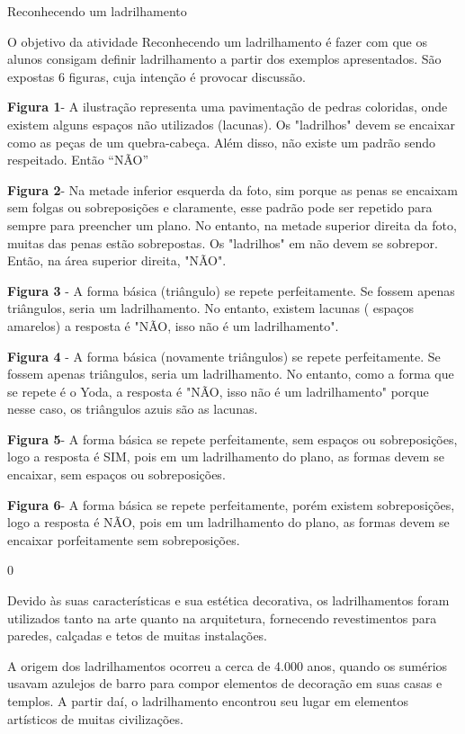 \begin{answer}{Reconhecendo um ladrilhamento}
{
	O objetivo da atividade Reconhecendo um ladrilhamento é fazer com que os alunos consigam definir ladrilhamento a partir dos exemplos apresentados. São expostas 6 figuras, cuja intenção é provocar discussão.

	\textbf{Figura 1}- A ilustração representa uma pavimentação de pedras coloridas, onde existem alguns espaços não utilizados (lacunas).  Os "ladrilhos" devem se encaixar como as peças de um quebra-cabeça. Além disso, não existe um padrão sendo respeitado. Então “NÃO”

	\textbf{Figura 2}- Na metade inferior esquerda da foto, sim porque as penas se encaixam sem folgas ou sobreposições e claramente, esse padrão pode ser repetido para sempre para preencher um plano. No entanto, na metade superior direita da foto, muitas das penas estão sobrepostas. Os "ladrilhos" em não devem se sobrepor. Então, na área superior direita, "NÃO".

	\textbf{Figura 3} - A forma básica (triângulo) se repete perfeitamente. Se fossem apenas triângulos, seria um ladrilhamento. No entanto, existem lacunas ( espaços amarelos) a resposta é  "NÃO, isso não é um ladrilhamento".

	\textbf{Figura 4} - A forma básica (novamente triângulos) se repete perfeitamente. Se fossem apenas triângulos, seria um ladrilhamento. No entanto, como a forma que se repete é o Yoda, a resposta é  "NÃO, isso não é um ladrilhamento" porque nesse caso, os triângulos azuis são as lacunas.


	\textbf{Figura 5}- A forma básica se repete perfeitamente, sem espaços ou sobreposições, logo a resposta é SIM, pois em um ladrilhamento do plano, as formas devem se encaixar, sem espaços ou sobreposições.

	\textbf{Figura 6}-  A forma básica se repete perfeitamente, porém existem sobreposições, logo a resposta é NÃO, pois em um ladrilhamento do plano, as formas devem se encaixar porfeitamente sem sobreposições.
}{0}
\end{answer}


\label{ladri-exp-1}

Devido às suas características e sua estética decorativa, os ladrilhamentos foram utilizados tanto na arte quanto na arquitetura, fornecendo revestimentos para paredes, calçadas e tetos de muitas instalações. 

A origem dos ladrilhamentos ocorreu a cerca de  4.000 anos, quando os sumérios usavam azulejos de barro para compor elementos de decoração em suas casas e templos. A partir daí, o ladrilhamento encontrou seu lugar em elementos artísticos de muitas civilizações. 


